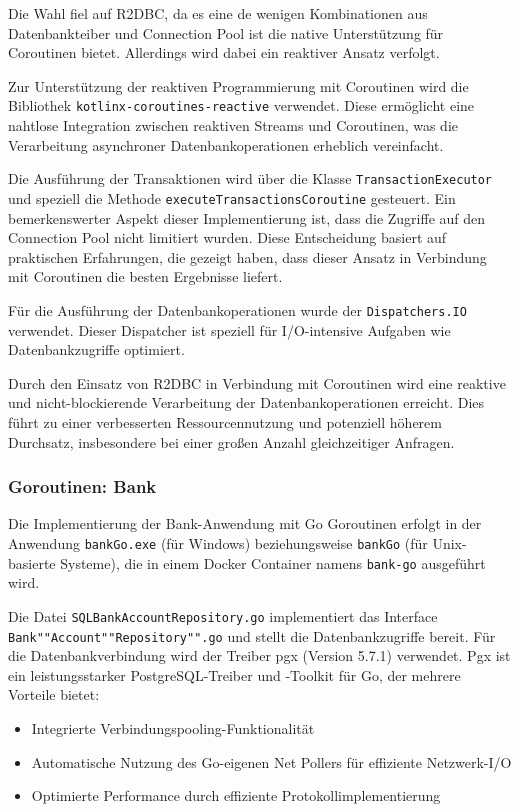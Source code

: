 \documentclass[fontsize=12pt,paper=a4,twoside=semi,parskip=half-,headsepline,headinclude]{scrreprt}
\begin{document}
Die Wahl fiel auf R2DBC, da es eine de wenigen Kombinationen aus Datenbankteiber und Connection Pool ist die native Unterstützung für Coroutinen bietet. Allerdings wird dabei ein reaktiver Ansatz verfolgt.

Zur Unterstützung der reaktiven Programmierung mit Coroutinen wird die Bibliothek \texttt{kotlinx-coroutines-reactive} verwendet. Diese ermöglicht eine nahtlose Integration zwischen reaktiven Streams und Coroutinen, was die Verarbeitung asynchroner Datenbankoperationen erheblich vereinfacht.

Die Ausführung der Transaktionen wird über die Klasse \texttt{TransactionExecutor} und speziell die Methode \texttt{executeTransactionsCoroutine} gesteuert. Ein bemerkenswerter Aspekt dieser Implementierung ist, dass die Zugriffe auf den Connection Pool nicht limitiert wurden. Diese Entscheidung basiert auf praktischen Erfahrungen, die gezeigt haben, dass dieser Ansatz in Verbindung mit Coroutinen die besten Ergebnisse liefert.

Für die Ausführung der Datenbankoperationen wurde der \texttt{Dispatchers.IO} verwendet. Dieser Dispatcher ist speziell für I/O-intensive Aufgaben wie Datenbankzugriffe optimiert.

Durch den Einsatz von R2DBC in Verbindung mit Coroutinen wird eine reaktive und nicht-blockierende Verarbeitung der Datenbankoperationen erreicht. Dies führt zu einer verbesserten Ressourcennutzung und potenziell höherem Durchsatz, insbesondere bei einer großen Anzahl gleichzeitiger Anfragen.

\subsubsection{Goroutinen: Bank}

Die Implementierung der Bank-Anwendung mit Go Goroutinen erfolgt in der Anwendung \texttt{bankGo.exe} (für Windows) beziehungsweise \texttt{bankGo} (für Unix-basierte Systeme), die in einem Docker Container namens \texttt{bank-go} ausgeführt wird.

Die Datei \texttt{SQLBankAccountRepository.go} implementiert das Interface \texttt{Bank""Account""Repository"".go} und stellt die Datenbankzugriffe bereit. Für die Datenbankverbindung wird der Treiber pgx (Version 5.7.1) verwendet. Pgx ist ein leistungsstarker Postgre\-SQL-Treiber und -Toolkit für Go, der mehrere Vorteile bietet:

\begin{itemize}
	\item Integrierte Verbindungspooling-Funktionalität
	\item Automatische Nutzung des Go-eigenen Net Pollers für effiziente Netzwerk-I/O
	\item Optimierte Performance durch effiziente Protokollimplementierung
\end{itemize}
\end{document}
